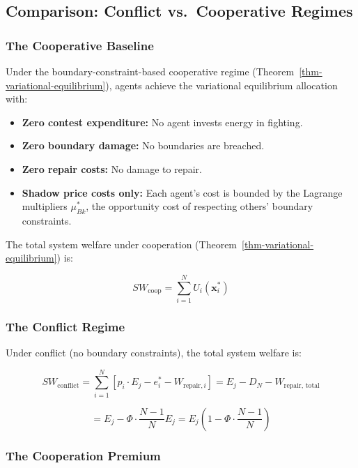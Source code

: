 \documentclass[11pt]{article}
\theoremstyle{plain}
\theoremstyle{definition}
\theoremstyle{remark}
\let\origsubsection\subsection
\renewcommand{\subsection}{\needspace{7\baselineskip}\origsubsection}
\let\origsubsubsection\subsubsection
\renewcommand{\subsubsection}{\needspace{4\baselineskip}\origsubsubsection}
\providecommand{\tightlist}{%
  \setlength{\itemsep}{0pt}\setlength{\parskip}{0pt}}
\begin{document}
\subsection{Comparison: Conflict vs.~Cooperative
Regimes}\label{comparison-conflict-vs.-cooperative-regimes}

\subsubsection{The Cooperative Baseline}\label{the-cooperative-baseline}

Under the boundary-constraint-based cooperative regime
(Theorem~\ref{thm-variational-equilibrium}), agents achieve the
variational equilibrium allocation with:

\begin{itemize}
\tightlist
\item
  \textbf{Zero contest expenditure:} No agent invests energy in
  fighting.
\item
  \textbf{Zero boundary damage:} No boundaries are breached.
\item
  \textbf{Zero repair costs:} No damage to repair.
\item
  \textbf{Shadow price costs only:} Each agent's cost is bounded by the
  Lagrange multipliers \(\mu_{Bk}^*\), the opportunity cost of
  respecting others' boundary constraints.
\end{itemize}

The total system welfare under cooperation
(Theorem~\ref{thm-variational-equilibrium}) is:

\[SW_{\text{coop}} = \sum_{i=1}^N U_i(\mathbf{x}_i^*)\]

\subsubsection{The Conflict Regime}\label{the-conflict-regime}

Under conflict (no boundary constraints), the total system welfare is:

\[SW_{\text{conflict}} = \sum_{i=1}^N \left[ p_i \cdot E_j - e_i^* - W_{\text{repair},i} \right] = E_j - D_N - W_{\text{repair, total}}\]

\[= E_j - \Phi \cdot \frac{N-1}{N} E_j = E_j \left(1 - \Phi \cdot \frac{N-1}{N}\right)\]

\subsubsection{The Cooperation Premium}\label{the-cooperation-premium}
\end{document}
